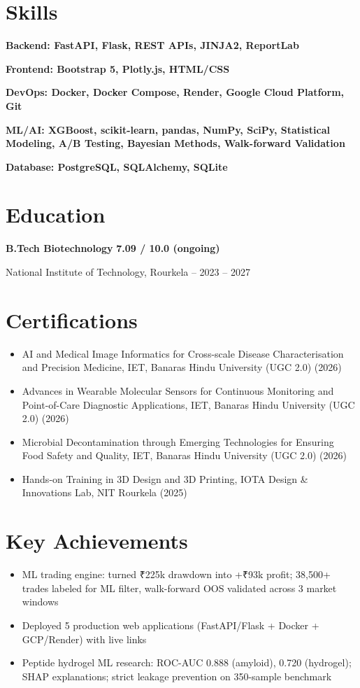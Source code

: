 \documentclass[11pt,a4paper]{article}
\begin{document}
\section*{Skills}
\noindent\textbf{Backend: FastAPI, Flask, REST APIs, JINJA2, ReportLab}

\noindent\textbf{Frontend: Bootstrap 5, Plotly.js, HTML/CSS}

\noindent\textbf{DevOps: Docker, Docker Compose, Render, Google Cloud Platform, Git}

\noindent\textbf{ML/AI: XGBoost, scikit-learn, pandas, NumPy, SciPy, Statistical Modeling, A/B Testing, Bayesian Methods, Walk-forward Validation}

\noindent\textbf{Database: PostgreSQL, SQLAlchemy, SQLite}

\section*{Education}
\noindent\textbf{B.Tech Biotechnology} \hfill \textbf{7.09 / 10.0 (ongoing)}

\noindent National Institute of Technology, Rourkela -- 2023 – 2027

\section*{Certifications}
\begin{itemize}
    \item AI and Medical Image Informatics for Cross-scale Disease Characterisation and Precision Medicine, IET, Banaras Hindu University (UGC 2.0) (2026)
    \item Advances in Wearable Molecular Sensors for Continuous Monitoring and Point-of-Care Diagnostic Applications, IET, Banaras Hindu University (UGC 2.0) (2026)
    \item Microbial Decontamination through Emerging Technologies for Ensuring Food Safety and Quality, IET, Banaras Hindu University (UGC 2.0) (2026)
    \item Hands-on Training in 3D Design and 3D Printing, IOTA Design \& Innovations Lab, NIT Rourkela (2025)
\end{itemize}

\section*{Key Achievements}
\begin{itemize}
    \item ML trading engine: turned ₹225k drawdown into +₹93k profit; 38,500+ trades labeled for ML filter, walk-forward OOS validated across 3 market windows
    \item Deployed 5 production web applications (FastAPI/Flask + Docker + GCP/Render) with live links
    \item Peptide hydrogel ML research: ROC-AUC 0.888 (amyloid), 0.720 (hydrogel); SHAP explanations; strict leakage prevention on 350-sample benchmark
\end{itemize}
\end{document}
